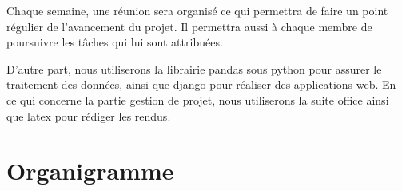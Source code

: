 Chaque semaine, une réunion sera organisé ce qui permettra de faire un point régulier de l'avancement du projet. Il permettra aussi à chaque membre de poursuivre les tâches qui lui sont attribuées.

D'autre part, nous utiliserons la librairie pandas sous python pour assurer le traitement des données, ainsi que django pour réaliser des applications web. En ce qui concerne la partie gestion de projet, nous utiliserons la suite office ainsi que latex pour rédiger les rendus.

\section*{Organigramme}


